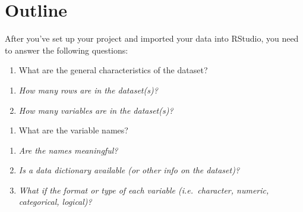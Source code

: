 \documentclass[letterpaper,9pt,twoside,]{pinp}
\providecommand{\tightlist}{%
  \setlength{\itemsep}{0pt}\setlength{\parskip}{0pt}}
\begin{document}
\begin{Shaded}
\begin{Highlighting}[]
        \KeywordTok{|}   \KeywordTok{|}   \KeywordTok{|}\ExtensionTok{{-}{-}}
        \KeywordTok{|}   \KeywordTok{|}\ExtensionTok{{-}{-}}
        \KeywordTok{|}   \KeywordTok{|}\ExtensionTok{{-}{-}}
        \KeywordTok{|}   \KeywordTok{|}\ExtensionTok{{-}{-}}
        \KeywordTok{|}       \KeywordTok{|}\ExtensionTok{{-}{-}}
        \KeywordTok{|}       \KeywordTok{|}\ExtensionTok{{-}{-}}
        \KeywordTok{|}       \KeywordTok{|}\ExtensionTok{{-}{-}}
        \KeywordTok{|}\ExtensionTok{{-}{-}}
        \KeywordTok{|}\ExtensionTok{{-}{-}}
\end{Highlighting}
\end{Shaded}

\hypertarget{outline}{%
\section{Outline}\label{outline}}

After you've set up your project and imported your data into RStudio,
you need to answer the following questions:

\begin{enumerate}
\def\labelenumi{\arabic{enumi}.}
\tightlist
\item
  What are the general characteristics of the dataset?\\
\end{enumerate}

\begin{enumerate}
\def\labelenumi{\alph{enumi}.}
\tightlist
\item
  \emph{How many rows are in the dataset(s)?}\\
\item
  \emph{How many variables are in the dataset(s)?}\\
\end{enumerate}

\begin{enumerate}
\def\labelenumi{\arabic{enumi}.}
\setcounter{enumi}{1}
\tightlist
\item
  What are the variable names?\\
\end{enumerate}

\begin{enumerate}
\def\labelenumi{\alph{enumi}.}
\tightlist
\item
  \emph{Are the names meaningful?}\\
\item
  \emph{Is a data dictionary available (or other info on the
  dataset)?}\\
\item
  \emph{What if the format or type of each variable (i.e.~character,
  numeric, categorical, logical)?}\\
\end{enumerate}
\end{document}
